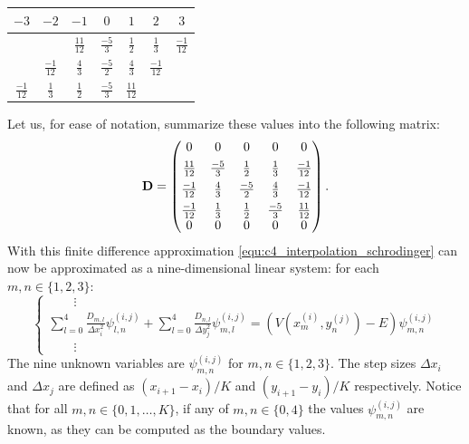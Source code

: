 \begin{center}
    \begin{tabular}{@{}ccc|c|ccc@{}}
        $-3$                               & $-2$            & $-1$            & $0$            & $1$             & $2$             & $3$             \\ \hline
        \rule{0pt}{3ex}                    &                 & $\frac{11}{12}$ & $\frac{-5}{3}$ & $\frac{1}{2}$   & $\frac{1}{3}$   & $\frac{-1}{12}$ \\
        \rule{0pt}{3ex}                    & $\frac{-1}{12}$ & $\frac{4}{3}$   & $\frac{-5}{2}$ & $\frac{4}{3}$   & $\frac{-1}{12}$ &                 \\
        \rule{0pt}{3ex}    $\frac{-1}{12}$ & $\frac{1}{3}$   & $\frac{1}{2}$   & $\frac{-5}{3}$ & $\frac{11}{12}$ &                 &
    \end{tabular}
\end{center}

Let us, for ease of notation, summarize these values into the following matrix:
$$
    \vb{D} = \begin{pmatrix}
        0                             & 0            & 0            & 0            & 0             \\
        \rule{0pt}{3ex} \frac{11}{12} & \frac{-5}{3} & \frac{1}{2}  & \frac{1}{3}  & \frac{-1}{12} \\
        \rule{0pt}{3ex} \frac{-1}{12} & \frac{4}{3}  & \frac{-5}{2} & \frac{4}{3}  & \frac{-1}{12} \\
        \rule{0pt}{3ex} \frac{-1}{12} & \frac{1}{3}  & \frac{1}{2}  & \frac{-5}{3} & \frac{11}{12} \\
        0                             & 0            & 0            & 0            & 0
    \end{pmatrix}\text{.}
$$
With this finite difference approximation \eqref{equ:c4_interpolation_schrodinger} can now be approximated as a nine-dimensional linear system: for each $m, n \in \{1,2,3\}$:
$$
    \begin{cases}
        \qquad\vdots                                                                                                                                                                                                 \\
        {\displaystyle \sum_{l=0}^4 \frac{D_{m, l}}{\Delta x_i^2}\psi^{(i,j)}_{l, n} + \sum_{l=0}^4 \frac{D_{n, l}}{\Delta y_j^2}\psi^{(i,j)}_{m, l} =  \left(V(x^{(i)}_m, y^{(j)}_n) - E\right)\psi^{(i,j)}_{m, n}} \\
        \qquad\vdots
    \end{cases}
$$
The nine unknown variables are $\psi^{(i, j)}_{m, n}$ for $m, n \in \{1,2,3\}$. The step sizes $\Delta x_i$ and $\Delta x_j$ are defined as $\left(x_{i+1} - x_{i}\right) / K$ and $\left(y_{i+1} - y_{i}\right) / K$ respectively. Notice that for all $m, n \in \{0,1,\dots, K\}$, if any of $m, n \in \{0, 4\}$ the values $\psi^{(i, j)}_{m, n}$ are known, as they can be computed as the boundary values.

